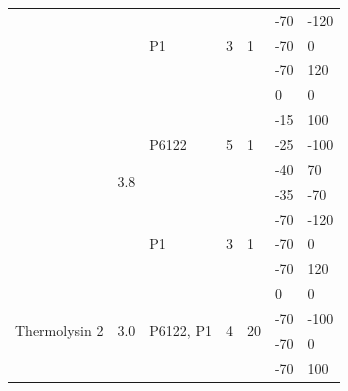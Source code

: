 \begin{table}[]
{\begin{tabular}{@{}lllllll@{}}
                           &                      & \multirow{3}{*}{P1}       & \multirow{3}{*}{3} & \multirow{3}{*}{1} & -70   & -120 \\
                           &                      &                           &                    &                    & -70   & 0    \\
                           &                      &                           &                    &                    & -70   & 120  \\ \cmidrule(l){2-7} 
                           & \multirow{8}{*}{3.8} & \multirow{5}{*}{P6122}    & \multirow{5}{*}{5} & \multirow{5}{*}{1} & 0     & 0    \\
                           &                      &                           &                    &                    & -15   & 100  \\
                           &                      &                           &                    &                    & -25   & -100 \\
                           &                      &                           &                    &                    & -40   & 70   \\
                           &                      &                           &                    &                    & -35   & -70  \\ \cmidrule(l){3-7} 
                           &                      & \multirow{3}{*}{P1}       & \multirow{3}{*}{3} & \multirow{3}{*}{1} & -70   & -120 \\
                           &                      &                           &                    &                    & -70   & 0    \\
                           &                      &                           &                    &                    & -70   & 120  \\ \midrule
\multirow{9}{*}{Thermolysin 2}  & \multirow{4}{*}{3.0} & \multirow{4}{*}{P6122, P1} & \multirow{4}{*}{4} & \multirow{4}{*}{20} & 0   & 0    \\
                           &                      &                           &                    &                    & -70   & -100 \\
                           &                      &                           &                    &                    & -70   & 0    \\
                           &                      &                           &                    &                    & -70   & 100  \\ \cmidrule(l){2-7} 

\end{tabular}}
\end{table}
